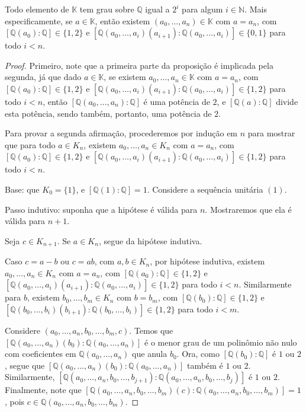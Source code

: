 \begin{prop}\label{prop:constritíveisSequencia}
    Todo elemento de $\mathbb K$ tem grau sobre $\mathbb Q$ igual a $2^i$ para algum $i\in \mathbb N$. Mais especificamente, se $a \in \mathbb K$, então existem $(a_0, \dots, a_n)\in \mathbb K$ com $a=a_n$, com $[\mathbb Q(a_0): \mathbb Q]\in \{1, 2\}$ e $[\mathbb Q(a_0, \dots, a_i)(a_{i+1}):\mathbb Q(a_0, \dots, a_i)]\in \{0, 1\}$ para todo $i<n$.
\end{prop}
\begin{proof}
    Primeiro, note que a primeira parte da proposição é implicada pela segunda, já que dado $a \in \mathbb K$, se existem $a_0, \dots, a_n\in \mathbb K$ com $a=a_n$, com $[\mathbb Q(a_0): \mathbb Q]\in \{1, 2\}$ e $[\mathbb Q(a_0, \dots, a_i)(a_{i+1}):\mathbb Q(a_0, \dots, a_i)]\in \{1, 2\}$ para todo $i<n$, então $[\mathbb Q(a_0, \dots, a_n):\mathbb Q]$ é uma potência de $2$, e $[\mathbb Q(a):\mathbb Q]$ divide esta potência, sendo também, portanto, uma potência de $2$.

    Para provar a segunda afirmação, procederemos por indução em $n$ para mostrar que para todo $a \in K_n$, existem $a_0, \dots, a_n\in K_n$ com $a=a_n$, com $[\mathbb Q(a_0): \mathbb Q]\in \{1, 2\}$ e $[\mathbb Q(a_0, \dots, a_i)(a_{i+1}):\mathbb Q(a_0, \dots, a_i)]\in \{1, 2\}$ para todo $i<n$.

    Base: que $K_0=\{1\}$, e $[\mathbb Q(1):\mathbb Q]=1$. Considere a sequência unitária $(1)$.

    Passo indutivo: suponha que a hipótese é válida para $n$. Mostraremos que ela é válida para $n+1$.

    Seja $c \in K_{n+1}$. Se $a \in K_n$, segue da hipótese indutiva.

    Caso $c=a-b$ ou $c=ab$, com $a, b \in K_n$, por hipótese indutiva, existem $a_0, \dots, a_n\in K_n$ com $a=a_n$, com $[\mathbb Q(a_0): \mathbb Q]\in \{1, 2\}$ e $[\mathbb Q(a_0, \dots, a_i)(a_{i+1}):\mathbb Q(a_0, \dots, a_i)]\in \{1, 2\}$ para todo $i<n$. Similarmente para $b$, existem $b_0, \dots, b_m\in K_n$ com $b=b_m$, com $[\mathbb Q(b_0): \mathbb Q]\in \{1, 2\}$ e $[\mathbb Q(b_0, \dots, b_i)(b_{i+1}):\mathbb Q(b_0, \dots, b_i)]\in \{1, 2\}$ para todo $i<m$.

    Considere $(a_0, \dots, a_n, b_0, \dots, b_m, c)$. Temos que $[\mathbb Q(a_0, \dots, a_n)(b_0):\mathbb Q(a_0, \dots, a_n)]$ é o menor grau de um polinômio não nulo com coeficientes em $\mathbb Q(a_0, \dots, a_n)$ que anula $b_0$. Ora, como $[\mathbb Q(b_0):\mathbb Q]$ é $1$ ou $2$, segue que $[\mathbb Q(a_0, \dots, a_n)(b_0):\mathbb Q(a_0, \dots, a_n)]$ também é $1$ ou $2$.
    Similarmente, $[\mathbb Q(a_0, \dots, a_n, b_0, \dots, b_{j+1}):\mathbb Q(a_0, \dots, a_n, b_0, \dots, b_{j})]$ é $1$ ou $2$.
    Finalmente, note que $[\mathbb Q(a_0, \dots, a_n, b_0, \dots, b_m)(c):\mathbb Q(a_0, \dots, a_n, b_0, \dots, b_m)]=1$,  pois $c \in \mathbb Q(a_0, \dots, a_n, b_0, \dots, b_m)$.


\end{proof}
